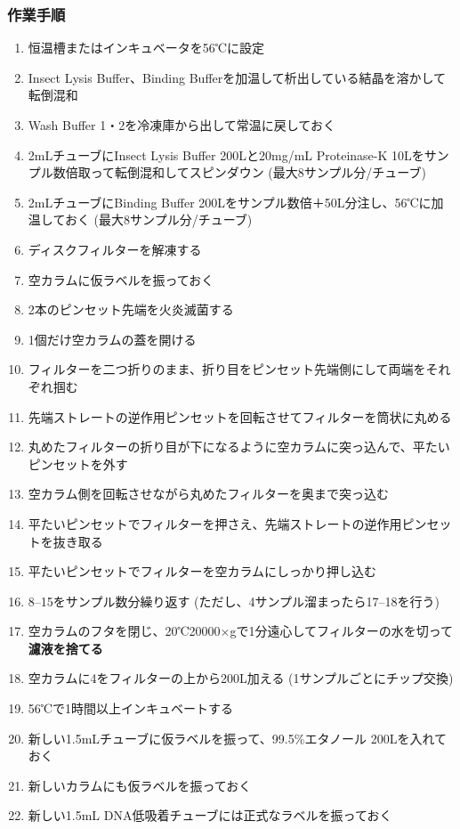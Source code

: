 \documentclass[titlepage,10pt,a4paper,uplatex]{jsbook}
\renewcommand{\textbf}[1]{{\bfseries\sffamily#1}}
\begin{document}
\subsubsection{作業手順}
\begin{enumerate}
\item 恒温槽またはインキュベータを56℃に設定
\item Insect Lysis Buffer、Binding Bufferを加温して析出している結晶を溶かして転倒混和
\item Wash Buffer 1・2を冷凍庫から出して常温に戻しておく
\item 2mLチューブにInsect Lysis Buffer 200{\textmu}Lと20mg/mL Proteinase-K 10{\textmu}Lをサンプル数倍取って転倒混和してスピンダウン (最大8サンプル分/チューブ)
\item 2mLチューブにBinding Buffer 200{\textmu}Lをサンプル数倍＋50{\textmu}L分注し、56℃に加温しておく (最大8サンプル分/チューブ)
\item ディスクフィルターを解凍する
\item 空カラムに仮ラベルを振っておく
\item 2本のピンセット先端を火炎滅菌する
\item 1個だけ空カラムの蓋を開ける
\item フィルターを二つ折りのまま、折り目をピンセット先端側にして両端をそれぞれ掴む
\item 先端ストレートの逆作用ピンセットを回転させてフィルターを筒状に丸める
\item 丸めたフィルターの折り目が下になるように空カラムに突っ込んで、平たいピンセットを外す
\item 空カラム側を回転させながら丸めたフィルターを奥まで突っ込む
\item 平たいピンセットでフィルターを押さえ、先端ストレートの逆作用ピンセットを抜き取る
\item 平たいピンセットでフィルターを空カラムにしっかり押し込む
\item 8--15をサンプル数分繰り返す (ただし、4サンプル溜まったら17--18を行う)
\item 空カラムのフタを閉じ、20℃20000×gで1分遠心してフィルターの水を切って\textbf{濾液を捨てる}
\item 空カラムに4をフィルターの上から200{\textmu}L加える (1サンプルごとにチップ交換)
\item 56℃で1時間以上インキュベートする
\item 新しい1.5mLチューブに仮ラベルを振って、99.5\%エタノール 200{\textmu}Lを入れておく
\item 新しいカラムにも仮ラベルを振っておく
\item 新しい1.5mL DNA低吸着チューブには正式なラベルを振っておく

\end{enumerate}
\end{document}
